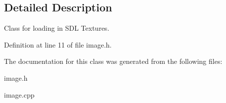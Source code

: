 \subsection{Detailed Description}
Class for loading in S\+DL Textures. 

Definition at line 11 of file image.\+h.



The documentation for this class was generated from the following files\+:\begin{DoxyCompactItemize}
\item 
image.\+h\item 
image.\+cpp\end{DoxyCompactItemize}
